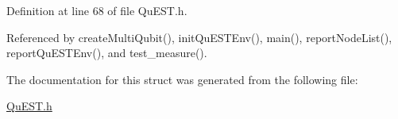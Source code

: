 Definition at line 68 of file QuEST.h.

Referenced by createMultiQubit(), initQuESTEnv(), main(), reportNodeList(), reportQuESTEnv(), and test\_\-measure().

The documentation for this struct was generated from the following file:\begin{DoxyCompactItemize}
\item 
\hyperlink{QuEST_8h}{QuEST.h}\end{DoxyCompactItemize}

